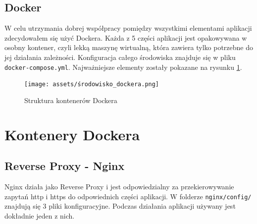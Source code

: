 \documentclass[shortabstract]{iithesis}
\begin{document}
\subsection{Docker}
W celu utrzymania dobrej współpracy pomiędzy wszystkimi elementami aplikacji zdecydowałem się użyć Dockera\cite{Docker}.
Każda z 5 części aplikacji jest opakowywana w osobny kontener, czyli lekką maszynę wirtualną, która zawiera tylko potrzebne do jej działania zależności.
Konfiguracja całego środowiska znajduje się w pliku \texttt{docker-compose.yml}. Najważniejsze elementy zostały pokazane na rysunku \ref{fig:docker_containers_environment}.

\begin{figure}[H]
    \centering
    \texttt{[image: assets/środowisko\_dockera.png]}
    \caption{Struktura kontenerów Dockera}
    \label{fig:docker_containers_environment}
\end{figure}
\section{Kontenery Dockera}

\subsection{Reverse Proxy - Nginx}
Nginx\cite{Nginx} działa jako Reverse Proxy i jest odpowiedzialny za przekierowywanie zapytań http i https do odpowiednich części aplikacji.
W folderze \texttt{nginx/config/} znajdują się 3 pliki konfiguracyjne. Podczas działania aplikacji używany jest dokładnie jeden z nich.
\end{document}
